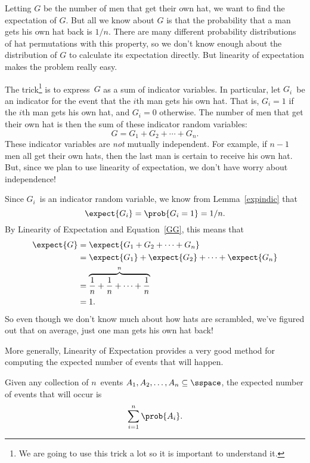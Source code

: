 Letting $G$ be the number of men that get their own hat, we want to find
the expectation of $G$.  But all we know about $G$ is that the probability
that a man gets his own hat back is $1/n$.  There are many different
probability distributions of hat permutations with this property, so we
don't know enough about the distribution of $G$ to calculate its
expectation directly.  But linearity of expectation makes the problem
really easy.

The trick\footnote{We are going to use this trick a lot so it is
  important to understand it.} is to express~$G$ as a sum of indicator
variables.  In particular, let $G_i$~be an indicator for the event
that the $i$th man gets his own hat.  That is, $G_i = 1$ if the $i$th
man gets his own hat, and $G_i = 0$ otherwise.  The number of men that
get their own hat is then the sum of these indicator random variables:
\begin{equation}\label{GG}
    G = G_1 + G_2 + \cdots + G_n.
\end{equation}
These indicator variables are \emph{not} mutually independent.  For
example, if $n-1$ men all get their own hats, then the last man is
certain to receive his own hat.  But, since we plan to use linearity
of expectation, we don't have worry about independence!

Since $G_i$~is an indicator random variable, we know from
Lemma~\ref{expindic} that
\begin{equation}
    \expect{G_i}= \prob{G_i=1} = 1/n.
\end{equation} 
By Linearity of Expectation and Equation~\ref{GG}, this means that
\begin{align*}
\expect{G} & = \expect{G_1 + G_2 + \cdots + G_n} \\
       & = \expect{G_1} + \expect{G_2} + \cdots + \expect{G_n}\\
       & = \overbrace{\frac{1}{n} + \frac{1}{n} + \cdots + \frac{1}{n}}^n \\
       &= 1.
\end{align*}
So even though we don't know much about how hats are scrambled, we've
figured out that on average, just one man gets his own hat back!

More generally, Linearity of Expectation provides a very good method
for computing the expected number of events that will happen.

\begin{theorem}\label{thm:17T3}
Given any collection of $n$~events $A_1, A_2, \dots, A_n
\subseteq \sspace$, the expected number of events that will occur is
\begin{equation*}
    \sum_{i = 1}^n \prob{A_i}.
\end{equation*}
\end{theorem}

